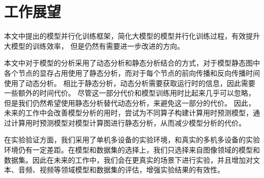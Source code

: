 \section{工作展望}

本文中提出的模型并行化训练框架\sys{}，简化大模型的模型并行化训练过程，有效提升大模型的训练效率，
但是仍然有需要进一步改进的方向。

本文中对于模型的分析采用了动态分析和静态分析结合的方式，对于模型静态图中各个节点的显存占用使用了静态分析，而对于每个节点的前向传播和反向传播时间使用了动态分析。
相比于静态分析，动态分析需要获取运行时的信息，因此需要一些额外的时间代价。
尽管这一部分代价和模型训练用时比起来几乎可以忽略，但是我们仍然希望使用静态分析替代动态分析，来避免这一部分的代价。
因此，未来的工作中会改善模型分析的用时，尝试为不同算子构建计算用时预测模型，通过计算用时预测模型对模型计算图进行静态分析，从而减少模型分析的代价。

在实验验证方面，我们采用了单机多设备的实验环境，和真实的多机多设备的实验环境仍有一定差距。在模型和数据集的选择上，我们只选择来自图像领域的模型和数据集。因此在未来的工作中，我们会在更真实的场景下进行实验，并且增加对文本、音频、视频等领域模型和数据集的评估，增强实验结果的有效性。